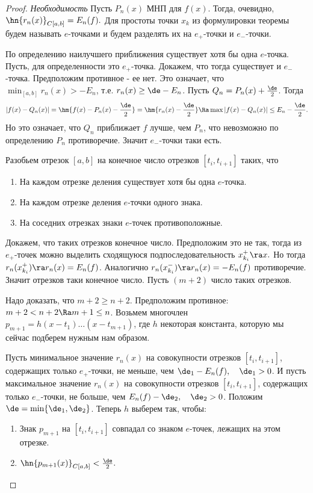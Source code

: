 \documentclass{article}
\begin{document}
\begin{proof}
  \emph{Необходимость}
  Пусть $P_n(x)$ МНП для $f(x)$. Тогда, очевидно,
  $\hn{r_n(x)}_{C[a,b]}=E_n(f).$ Для простоты точки $x_k$ из
  формулировки теоремы будем называть $e$-точками и будем разделять
  их на $e_+$-точки и $e_-$-точки.

  По определению наилучшего приближения существует хотя бы одна
  $e$-точка. Пусть, для определенности это $e_+$-точка. Докажем, что
  тогда существует и $e_-$-точка. Предположим противное - ее нет.
  Это означает, что $\min_{[a,b]}r_n(x)>-E_n$, т.е. $r_n(x)\ge
  \de-E_n$. Пусть $Q_n=P_n(x)+\frac{\de}2$. Тогда
  $$|f(x)-Q_n(x)|=\hm{f(x)-P_n(x)-\frac{\de}2}=\hm{r_n(x)-\frac{\de}2}\Ra
  \max|f(x)-Q_n(x)|\le E_n-\frac{\de}2.$$ Но это означает, что
  $Q_n$ приближает $f$ лучше, чем $P_n$, что невозможно по
  определению $P_n$ противоречие. Значит $e_-$-точки таки есть.

  Разобьем отрезок $[a,b]$ на конечное число отрезков
  $[t_i,t_{i+1}]$ таких, что
  \begin{enumerate}
  \item
    На каждом отрезке деления существует хотя бы одна $e$-точка.
  \item
    На каждом отрезке деления $e$-точки одного знака.
  \item
    На соседних отрезках знаки $e$-точек противоположные.
  \end{enumerate}

  Докажем, что таких отрезков конечное число. Предположим это не
  так, тогда из $e_+$-точек можно выделить сходящуюся
  подпоследовательность $x_{k_i}^+\ra x.$ Но тогда
  $r_n(x_{k_i}^+)\ra r_n(x)=E_n(f)$. Аналогично
  $r_n(x_{k_i}^-)\ra r_n(x)=-E_n(f)$ противоречие. Значит
  отрезков таки конечное число. Пусть $(m+2)$ число таких
  отрезков.

  Надо доказать, что $m+2\ge n+2$. Предположим противное:
  $m+2<n+2\Ra m+1\le n$. Возьмем многочлен
  $p_{m+1}=h(x-t_1)\dots(x-t_{m+1})$, где $h$ некоторая константа,
  которую мы сейчас подберем нужным нам образом.

  Пусть минимальное значение $r_n(x)$ на совокупности отрезков
  $[t_i,t_{i+1}]$, содержащих только $e_+$-точки, не меньше, чем
  $\de_1-E_n(f),\quad\de_1>0$. И пусть максимальное значение
  $r_n(x)$ на совокупности отрезков $[t_i,t_{i+1}]$, содержащих
  только $e_-$-точки, не больше, чем
  $E_n(f)-\de_2,\quad\de_2>0$. Положим
  $\de=\min\{\de_1,\de_2\}$. Теперь $h$ выберем так, чтобы:
  \begin{enumerate}
  \item
    Знак $p_{m+1}$ на $[t_i,t_{i+1}]$ совпадал со знаком $e$-точек,
    лежащих на этом отрезке.
  \item
    $\hn{p_{m+1}(x)}_{C[a,b]}<\frac{\de}2.$
  \end{enumerate}


\end{proof}
\end{document}
